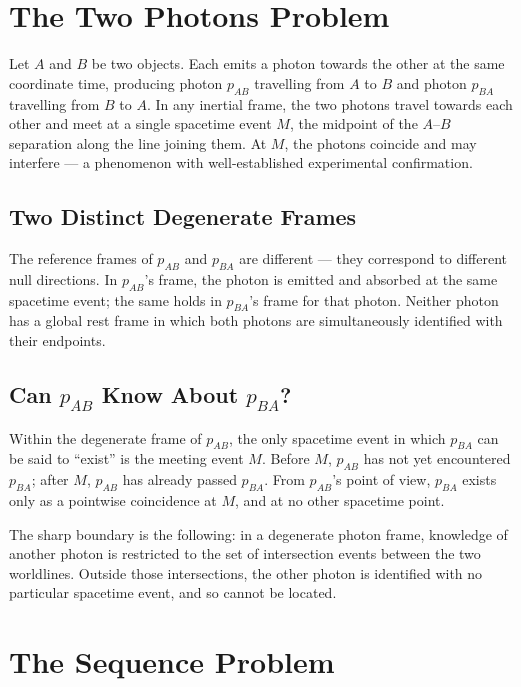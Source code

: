 \documentclass[11pt]{article}
\begin{document}
\section{The Two Photons Problem}

Let $A$ and $B$ be two objects. Each emits a photon towards the other at the same coordinate time, producing photon $p_{AB}$ travelling from $A$ to $B$ and photon $p_{BA}$ travelling from $B$ to $A$. In any inertial frame, the two photons travel towards each other and meet at a single spacetime event $M$, the midpoint of the $A$--$B$ separation along the line joining them. At $M$, the photons coincide and may interfere --- a phenomenon with well-established experimental confirmation.

\subsection{Two Distinct Degenerate Frames}

The reference frames of $p_{AB}$ and $p_{BA}$ are different --- they correspond to different null directions. In $p_{AB}$'s frame, the photon is emitted and absorbed at the same spacetime event; the same holds in $p_{BA}$'s frame for that photon. Neither photon has a global rest frame in which both photons are simultaneously identified with their endpoints.

\subsection{Can $p_{AB}$ Know About $p_{BA}$?}

Within the degenerate frame of $p_{AB}$, the only spacetime event in which $p_{BA}$ can be said to ``exist'' is the meeting event $M$. Before $M$, $p_{AB}$ has not yet encountered $p_{BA}$; after $M$, $p_{AB}$ has already passed $p_{BA}$. From $p_{AB}$'s point of view, $p_{BA}$ exists only as a pointwise coincidence at $M$, and at no other spacetime point.

The sharp boundary is the following: in a degenerate photon frame, knowledge of another photon is restricted to the set of intersection events between the two worldlines. Outside those intersections, the other photon is identified with no particular spacetime event, and so cannot be located.

\section{The Sequence Problem}
\end{document}
